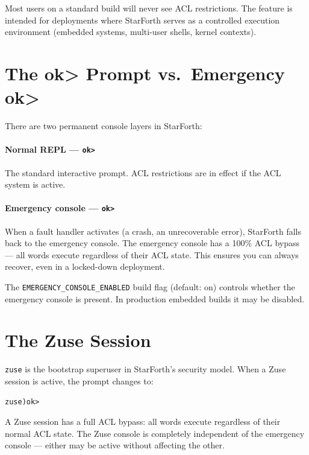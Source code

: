 Most users on a standard build will never see ACL restrictions. The feature
is intended for deployments where StarForth serves as a controlled execution
environment (embedded systems, multi-user shells, kernel contexts).

\section{The ok> Prompt vs.\ Emergency ok>}
\label{sec:acl-prompts}

There are two permanent console layers in StarForth:

\paragraph{Normal REPL --- \texttt{ok>}}
The standard interactive prompt. ACL restrictions are in effect if the ACL
system is active.

\paragraph{Emergency console --- \texttt{ok>}}
When a fault handler activates (a crash, an unrecoverable error), StarForth
falls back to the emergency console. The emergency console has a 100\% ACL
bypass --- all words execute regardless of their ACL state. This ensures you
can always recover, even in a locked-down deployment.

The \texttt{EMERGENCY\_CONSOLE\_ENABLED} build flag (default: on) controls
whether the emergency console is present. In production embedded builds it may
be disabled.

\section{The Zuse Session}
\label{sec:acl-zuse}

\texttt{zuse} is the bootstrap superuser in StarForth's security model. When a
Zuse session is active, the prompt changes to:

\begin{lstlisting}[language=Forth]
zuse)ok>
\end{lstlisting}

A Zuse session has a full ACL bypass: all words execute regardless of their
normal ACL state. The Zuse console is completely independent of the emergency
console --- either may be active without affecting the other.

